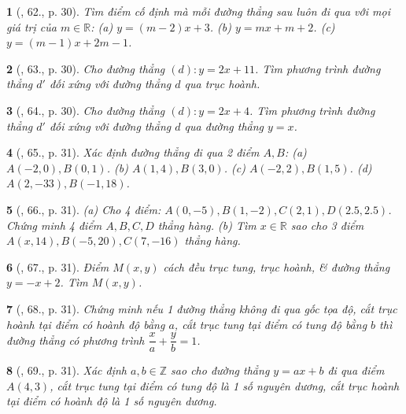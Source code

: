 \documentclass{article}
\newtheorem{baitoan}{}
\begin{document}
\begin{baitoan}[\cite{Binh_Toan_9_tap_1}, 62., p. 30]
	Tìm điểm cố định mà mỗi đường thẳng sau luôn đi qua với mọi giá trị của $m\in\mathbb{R}$: (a) $y = (m - 2)x + 3$. (b) $y = mx + m + 2$. (c) $y = (m - 1)x + 2m - 1$.
\end{baitoan}

\begin{baitoan}[\cite{Binh_Toan_9_tap_1}, 63., p. 30]
	Cho đường thẳng $(d):y = 2x + 11$. Tìm phương trình đường thẳng $d'$ đối xứng với đường thẳng $d$ qua trục hoành.
\end{baitoan}

\begin{baitoan}[\cite{Binh_Toan_9_tap_1}, 64., p. 30]
	Cho đường thẳng $(d):y = 2x + 4$. Tìm phương trình đường thẳng $d'$ đối xứng với đường thẳng $d$ qua đường thẳng $y = x$.
\end{baitoan}

\begin{baitoan}[\cite{Binh_Toan_9_tap_1}, 65., p. 31]
	Xác định đường thẳng đi qua 2 điểm $A,B$: (a) $A(-2,0),B(0,1)$. (b) $A(1,4),B(3,0)$. (c) $A(-2,2),B(1,5)$. (d) $A(2,-33),B(-1,18)$.
\end{baitoan}

\begin{baitoan}[\cite{Binh_Toan_9_tap_1}, 66., p. 31]
	(a) Cho 4 điểm: $A(0,-5),B(1,-2),C(2,1),D(2.5,2.5)$. Chứng minh 4 điểm $A,B,C,D$ thẳng hàng. (b) Tìm $x\in\mathbb{R}$ sao cho 3 điểm $A(x,14),B(-5,20),C(7,-16)$ thẳng hàng.
\end{baitoan}

\begin{baitoan}[\cite{Binh_Toan_9_tap_1}, 67., p. 31]
	Điểm $M(x,y)$ cách đều trục tung, trục hoành, \& đường thẳng $y = -x + 2$. Tìm $M(x,y)$.
\end{baitoan}

\begin{baitoan}[\cite{Binh_Toan_9_tap_1}, 68., p. 31]
	Chứng minh nếu 1 đường thẳng không đi qua gốc tọa độ, cắt trục hoành tại điểm có hoành độ bằng $a$, cắt trục tung tại điểm có tung độ bằng $b$ thì đường thẳng có phương trình $\dfrac{x}{a} + \dfrac{y}{b} = 1$.
\end{baitoan}

\begin{baitoan}[\cite{Binh_Toan_9_tap_1}, 69., p. 31]
	Xác định $a,b\in\mathbb{Z}$ sao cho đường thẳng $y = ax + b$ đi qua điểm $A(4,3)$, cắt trục tung tại điểm có tung độ là 1 số nguyên dương, cắt trục hoành tại điểm có hoành độ là 1 số nguyên dương.
\end{baitoan}
\end{document}
